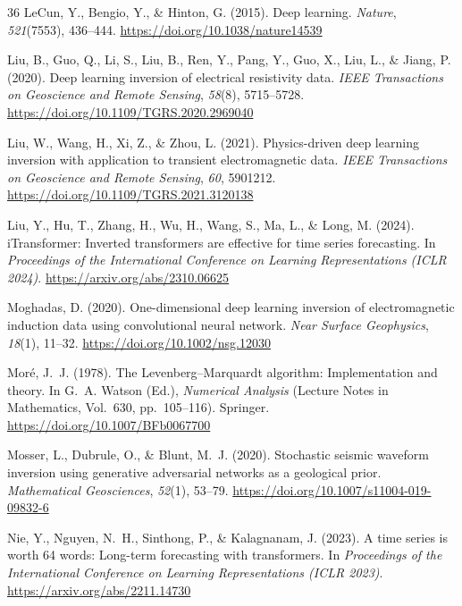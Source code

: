 \documentclass[journal]{IEEEtran}
\begin{document}
\begin{thebibliography}{36}
LeCun, Y., Bengio, Y., \& Hinton, G. (2015).
Deep learning.
\textit{Nature}, \textit{521}(7553), 436--444.
\url{https://doi.org/10.1038/nature14539}

Liu, B., Guo, Q., Li, S., Liu, B., Ren, Y., Pang, Y., Guo, X.,
Liu, L., \& Jiang, P. (2020).
Deep learning inversion of electrical resistivity data.
\textit{IEEE Transactions on Geoscience and Remote Sensing},
\textit{58}(8), 5715--5728.
\url{https://doi.org/10.1109/TGRS.2020.2969040}

Liu, W., Wang, H., Xi, Z., \& Zhou, L. (2021).
Physics-driven deep learning inversion with application to
transient electromagnetic data.
\textit{IEEE Transactions on Geoscience and Remote Sensing},
\textit{60}, 5901212.
\url{https://doi.org/10.1109/TGRS.2021.3120138}

Liu, Y., Hu, T., Zhang, H., Wu, H., Wang, S., Ma, L., \& Long, M.
(2024).
iTransformer: Inverted transformers are effective for time series
forecasting.
In \textit{Proceedings of the International Conference on Learning
Representations (ICLR 2024)}.
\url{https://arxiv.org/abs/2310.06625}

Moghadas, D. (2020).
One-dimensional deep learning inversion of electromagnetic induction
data using convolutional neural network.
\textit{Near Surface Geophysics}, \textit{18}(1), 11--32.
\url{https://doi.org/10.1002/nsg.12030}

Mor{\'e}, J.~J. (1978).
The Levenberg--Marquardt algorithm: Implementation and theory.
In G.~A. Watson (Ed.), \textit{Numerical Analysis} (Lecture Notes
in Mathematics, Vol.~630, pp.~105--116). Springer.
\url{https://doi.org/10.1007/BFb0067700}

Mosser, L., Dubrule, O., \& Blunt, M.~J. (2020).
Stochastic seismic waveform inversion using generative adversarial
networks as a geological prior.
\textit{Mathematical Geosciences}, \textit{52}(1), 53--79.
\url{https://doi.org/10.1007/s11004-019-09832-6}

Nie, Y., Nguyen, N.~H., Sinthong, P., \& Kalagnanam, J. (2023).
A time series is worth 64 words: Long-term forecasting with
transformers.
In \textit{Proceedings of the International Conference on Learning
Representations (ICLR 2023)}.
\url{https://arxiv.org/abs/2211.14730}


\end{thebibliography}
\end{document}
